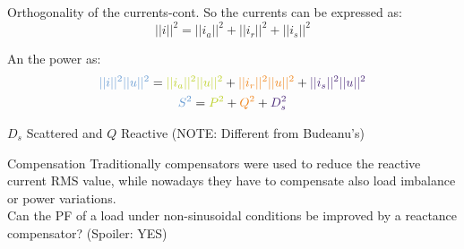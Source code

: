 \documentclass[aspectratio=169]{beamer}
\begin{document}
  \begin{frame}{Orthogonality of the currents-cont.}{\insertsection}
    So the currents can be expressed as:
    \begin{equation}
      ||i||^2 = ||i_a||^2 + ||i_r||^2 + ||i_s||^2
    \end{equation}

    \begin{figure}
      \centering
    \end{figure}
    
    An the power as:
    \begin{gather}
      \textcolor{NTNU_blue}{||i||^2||u||^2} =  \textcolor{NTNU_green}{||i_a||^2||u||^2} + \textcolor{NTNU_orange}{||i_r||^2||u||^2}  + \textcolor{NTNU_purple}{||i_s||^2||u||^2}\\
      \textcolor{NTNU_blue}{S^2} = \textcolor{NTNU_green}{P^2} + \textcolor{NTNU_orange}{Q^2} + \textcolor{NTNU_purple}{D_s^2}
    \end{gather}

    \textcolor{NTNU_purple}{$D_s$} Scattered and \textcolor{NTNU_orange}{$Q$} Reactive  (NOTE: Different from Budeanu's)

  \end{frame}

  \begin{frame}{Compensation}{{\insertsection}}
    Traditionally compensators were used to reduce the reactive current RMS value, while nowadays they have to compensate also load imbalance or power variations. \\
    \textcolor{NTNU_orange}{Can the PF of a load under non-sinusoidal conditions be improved by a reactance compensator?} \textcolor{NTNU_purple}{(Spoiler: YES)}
  \end{frame}
\end{document}
